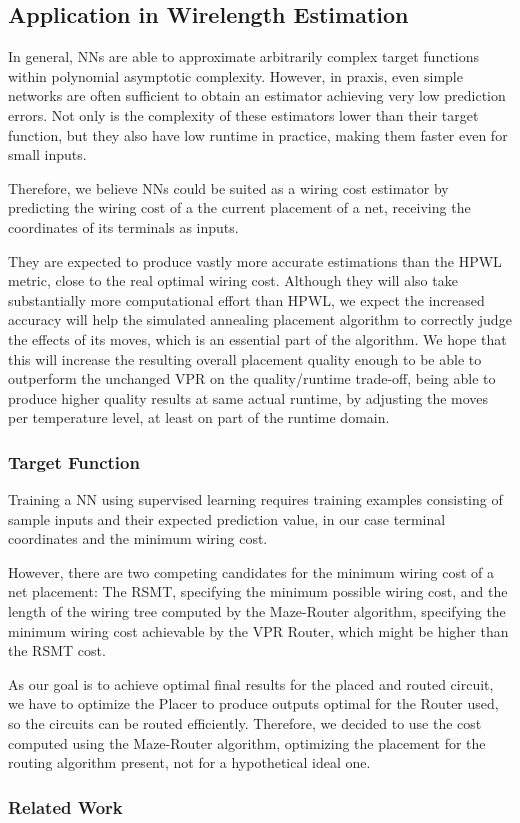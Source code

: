 \subsection{Application in Wirelength Estimation}

In general, \glspl{NN} are able to approximate arbitrarily complex target functions\cite{TODO} within polynomial asymptotic complexity\cite{NN-complexity-web}\cite{TODO}. However, in praxis, even simple networks are often sufficient to obtain an estimator achieving very low prediction errors. Not only is the complexity of these estimators lower than their target function, but they also have low runtime in practice, making them faster even for small inputs.

Therefore, we believe \glspl{NN} could be suited as a wiring cost estimator by predicting the wiring cost of a the current placement of a net, receiving the coordinates of its terminals as inputs. 

They are expected to produce vastly more accurate estimations than the \gls{HPWL} metric, close to the real optimal wiring cost. Although they will also take substantially more computational effort than \gls{HPWL}, we expect the increased accuracy will help the simulated annealing placement algorithm to correctly judge the effects of its moves, which is an essential part of the algorithm. We hope that this will increase the resulting overall placement quality enough to be able to outperform the unchanged \gls{VPR} on the quality/runtime trade-off, being able to produce higher quality results at same actual runtime, by adjusting the moves per temperature level, at least on part of the runtime domain.

\subsubsection{Target Function}

Training a \gls{NN} using supervised learning requires training examples consisting of sample inputs and their expected prediction value, in our case terminal coordinates and the minimum wiring cost.

However, there are two competing candidates for the minimum wiring cost of a net placement: The \gls{RSMT}, specifying the minimum possible wiring cost, and the length of the wiring tree computed by the Maze-Router algorithm\cite{Maze-Router}, specifying the minimum wiring cost achievable by the \gls{VPR} Router, which might be higher than the \gls{RSMT} cost.

As our goal is to achieve optimal final results for the placed and routed circuit, we have to optimize the Placer to produce outputs optimal for the Router used, so the circuits can be routed efficiently. Therefore, we decided to use the cost computed using the Maze-Router algorithm, optimizing the placement for the routing algorithm present, not for a hypothetical ideal one.

\subsubsection{Related Work}
